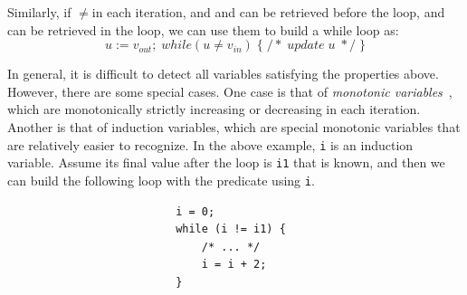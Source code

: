 \begin{itemize}
Similarly, if \viter$\ne$\vinit  in each iteration, and  \vinit and \vfinal can be retrieved before the loop, and \vmu can be retrieved in the loop, we can use them to build a while loop as: 
$$
u := v_{out}; \; while (u \ne v_{in}) \;  \{\; /* \; update \; u \; */ \; \}
$$

In general, it is difficult to detect all variables satisfying the properties above.
However, there are some special cases.
One case is that of \emph{monotonic variables}~\cite{Wolfe1992}, which are monotonically strictly increasing or decreasing in each iteration.
Another is that of induction variables, which are special monotonic variables that are relatively easier to recognize. In the above example, \texttt{i} is an induction variable. Assume its final value after the loop is \texttt{i1} that is known, and then we can build the following loop with the predicate using \texttt{i}.



\small
\begin{verbatim}
                          i = 0;
                          while (i != i1) {
                              /* ... */
                              i = i + 2;
                          }
\end{verbatim}
\normalsize



\end{itemize}
